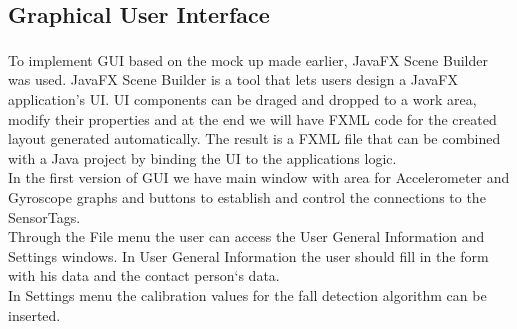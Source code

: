 \documentclass[hidelinks,conference,12pt]{IEEETran}
\begin{document}
\subsection{Graphical User Interface} 
To implement GUI based on the mock up made earlier, JavaFX Scene Builder\textsuperscript{\cite{JavaFX}} was used. JavaFX Scene Builder is a tool that lets users design a JavaFX application’s UI. UI components can be
draged and dropped to a work area, modify their properties and at the end we will have FXML code
for the created layout generated automatically. The result is a FXML file that can be combined with a Java project by binding the UI to the applications logic.\\
In the first version of GUI we have main window with area for Accelerometer and Gyroscope graphs
and buttons to establish and control the connections to the SensorTags.\\
Through the File menu the user can access the User General Information and Settings windows.
In User General Information the user should fill in the form with his data and the contact person‘s data.\\
In Settings menu the calibration values for the fall detection algorithm can be inserted.

\nocite{*}
\printbibliography
\end{document}
